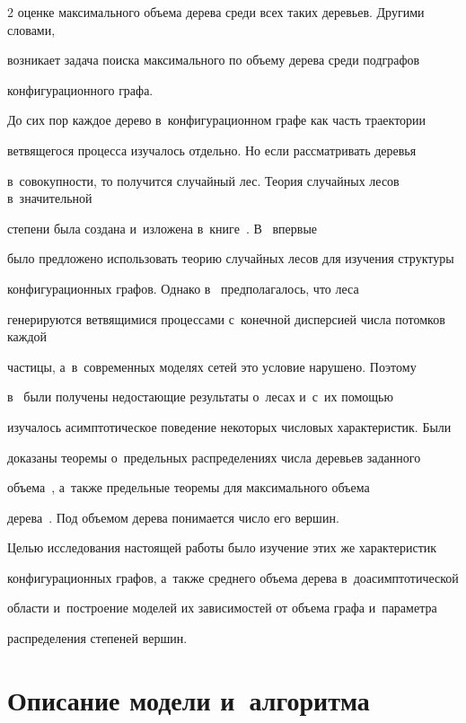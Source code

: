 \begin{multicols}{2}
оценке максимального объема дерева среди всех таких деревьев. Другими словами, 


возникает задача поиска максимального по объему дерева среди подграфов 


конфигурационного графа.


До сих пор каждое дерево в~конфигурационном графе как часть траектории 


вет\-вя\-ще\-го\-ся процесса изуча\-лось отдельно. Но если рассматривать деревья 


в~совокупности, то получится случайный лес. Тео\-рия случайных лесов в~значительной 


степени была создана и~изложена в~книге~\cite{Pav2}. В~\cite{Pav,PavCh} впервые 


было предложено использовать тео\-рию случайных лесов для изучения структуры 


конфигурационных графов. Однако в~\cite{Pav2} предполагалось, что леса 


генерируются вет\-вя\-щи\-ми\-ся процессами с~конечной дисперсией чис\-ла потомков каждой 


частицы, а~в~современных моделях сетей это условие нарушено. Поэтому 


в~\cite{Pav,PavCh} были получены не\-до\-ста\-ющие результаты о~лесах и~с~их по\-мощью 


изучалось асимп\-то\-ти\-че\-ское поведение некоторых чис\-ло\-вых характеристик. Были 


доказаны теоремы о~предельных распределениях чис\-ла деревьев заданного 


объема~\cite{PavCh}, а~также предельные тео\-ре\-мы для максимального объема 


дерева~\cite{Pav}. Под объемом дерева понимается чис\-ло его вершин.


Целью исследования на\-сто\-ящей работы было изучение этих же характеристик 


конфигурационных графов, а~так\-же среднего объема дерева в~доасимптотической 


об\-ласти и~по\-стро\-ение моделей их зависимостей от объема графа и~па\-ра\-мет\-ра 


распределения степеней вершин.





\section{Описание модели и~алгоритма}






\end{multicols}

